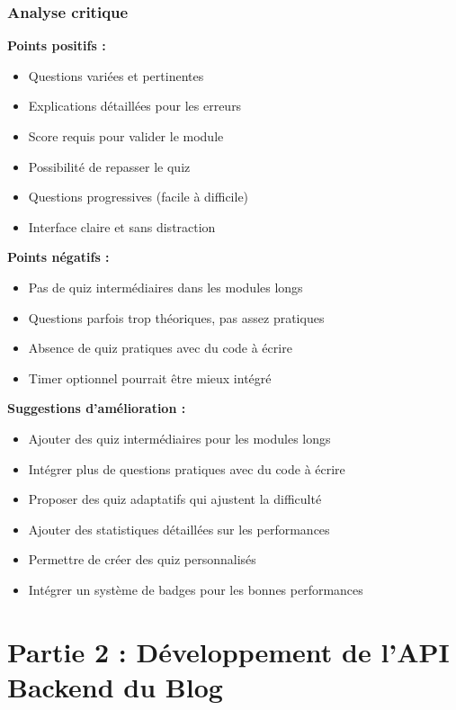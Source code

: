 \documentclass[12pt,a4paper]{article}
\begin{document}
\subsubsection{Analyse critique}

\textbf{Points positifs :}
\begin{itemize}
    \item Questions variées et pertinentes
    \item Explications détaillées pour les erreurs
    \item Score requis pour valider le module
    \item Possibilité de repasser le quiz
    \item Questions progressives (facile à difficile)
    \item Interface claire et sans distraction
\end{itemize}

\textbf{Points négatifs :}
\begin{itemize}
    \item Pas de quiz intermédiaires dans les modules longs
    \item Questions parfois trop théoriques, pas assez pratiques
    \item Absence de quiz pratiques avec du code à écrire
    \item Timer optionnel pourrait être mieux intégré
\end{itemize}

\textbf{Suggestions d'amélioration :}
\begin{itemize}
    \item Ajouter des quiz intermédiaires pour les modules longs
    \item Intégrer plus de questions pratiques avec du code à écrire
    \item Proposer des quiz adaptatifs qui ajustent la difficulté
    \item Ajouter des statistiques détaillées sur les performances
    \item Permettre de créer des quiz personnalisés
    \item Intégrer un système de badges pour les bonnes performances
\end{itemize}

\newpage

\section{Partie 2 : Développement de l'API Backend du Blog}
\end{document}
